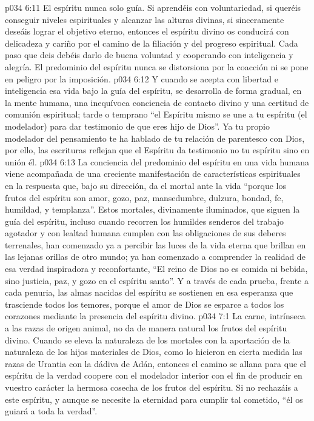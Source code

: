 \vs p034 6:11 \pc El espíritu nunca  solo guía. Si aprendéis con voluntariedad, si queréis conseguir niveles espirituales y alcanzar las alturas divinas, si sinceramente deseáis lograr el objetivo eterno, entonces el espíritu divino os conducirá con delicadeza y cariño por el camino de la filiación y del progreso espiritual. Cada paso que deis debéis darlo de buena voluntad y cooperando con inteligencia y alegría. El predominio del espíritu nunca se distorsiona por la coacción ni se pone en peligro por la imposición.
\vs p034 6:12 Y cuando se acepta con libertad e inteligencia esa vida bajo la guía del espíritu, se desarrolla de forma gradual, en la mente humana, una inequívoca conciencia de contacto divino y una certitud de comunión espiritual; tarde o temprano “el Espíritu mismo se une a tu espíritu (el modelador) para dar testimonio de que eres hijo de Dios”. Ya tu propio modelador del pensamiento te ha hablado de tu relación de parentesco con Dios, por ello, las escrituras reflejan que el Espíritu da testimonio no  tu espíritu sino en unión  él.
\vs p034 6:13 La conciencia del predominio del espíritu en una vida humana viene acompañada de una creciente manifestación de características espirituales en la respuesta que, bajo su dirección, da el mortal ante la vida “porque los frutos del espíritu son amor, gozo, paz, mansedumbre, dulzura, bondad, fe, humildad, y templanza”. Estos mortales, divinamente iluminados, que siguen la guía del espíritu, incluso cuando recorren los humildes senderos del trabajo agotador y con lealtad humana cumplen con las obligaciones de sus deberes terrenales, han comenzado ya a percibir las luces de la vida eterna que brillan en las lejanas orillas de otro mundo; ya han comenzado a comprender la realidad de esa verdad inspiradora y reconfortante, “El reino de Dios no es comida ni bebida, sino justicia, paz, y gozo en el espíritu santo”. Y a través de cada prueba, frente a cada penuria, las almas nacidas del espíritu se sostienen en esa esperanza que trasciende todos los temores, porque el amor de Dios se esparce a todos los corazones mediante la presencia del espíritu divino.
\vs p034 7:1 La carne, intrínseca a las razas de origen animal, no da de manera natural los frutos del espíritu divino. Cuando se eleva la naturaleza de los mortales con la aportación de la naturaleza de los hijos materiales de Dios, como lo hicieron en cierta medida las razas de Urantia con la dádiva de Adán, entonces el camino se allana para que el espíritu de la verdad coopere con el modelador interior con el fin de producir en vuestro carácter la hermosa cosecha de los frutos del espíritu. Si no rechazáis a este espíritu, y aunque se necesite la eternidad para cumplir tal cometido, “él os guiará a toda la verdad”.
